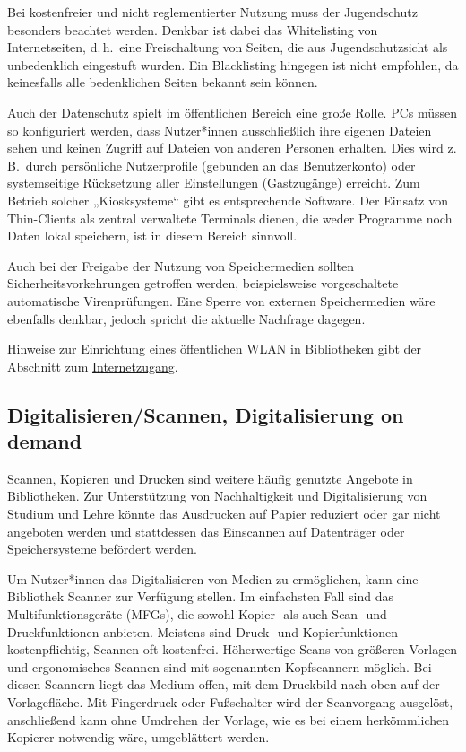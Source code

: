 \documentclass[
  11pt,
  letterpaper,
  DIV=11,
  twoside]{scrreprt}
\begin{document}
Bei kostenfreier und nicht reglementierter Nutzung muss der Jugendschutz
besonders beachtet werden. Denkbar ist dabei das Whitelisting von
Internetseiten, d.\,h.~eine Freischaltung von Seiten, die aus
Jugendschutzsicht als unbedenklich eingestuft wurden. Ein Blacklisting
hingegen ist nicht empfohlen, da keinesfalls alle bedenklichen Seiten
bekannt sein können.

Auch der Datenschutz spielt im öffentlichen Bereich eine große Rolle.
PCs müssen so konfiguriert werden, dass Nutzer*innen ausschließlich ihre
eigenen Dateien sehen und keinen Zugriff auf Dateien von anderen
Personen erhalten. Dies wird z.\,B.~durch persönliche Nutzerprofile
(gebunden an das Benutzerkonto) oder systemseitige Rücksetzung aller
Einstellungen (Gastzugänge) erreicht. Zum Betrieb solcher
„Kiosksysteme`` gibt es entsprechende Software. Der Einsatz von
Thin-Clients als zentral verwaltete Terminals dienen, die weder
Programme noch Daten lokal speichern, ist in diesem Bereich sinnvoll.

Auch bei der Freigabe der Nutzung von Speichermedien sollten
Sicherheitsvorkehrungen getroffen werden, beispielsweise vorgeschaltete
automatische Virenprüfungen. Eine Sperre von externen Speichermedien
wäre ebenfalls denkbar, jedoch spricht die aktuelle Nachfrage dagegen.

Hinweise zur Einrichtung eines öffentlichen WLAN in Bibliotheken gibt
der Abschnitt zum \hyperref[internetzugang]{Internetzugang}.

\subsection{Digitalisieren/Scannen, Digitalisierung on
demand}\label{digitalisierenscannen-digitalisierung-on-demand}

Scannen, Kopieren und Drucken sind weitere häufig genutzte Angebote in
Bibliotheken. Zur Unterstützung von Nachhaltigkeit und Digitalisierung
von Studium und Lehre könnte das Ausdrucken auf Papier reduziert oder
gar nicht angeboten werden und stattdessen das Einscannen auf
Datenträger oder Speichersysteme befördert werden.

Um Nutzer*innen das Digitalisieren von Medien zu ermöglichen, kann eine
Bibliothek Scanner zur Verfügung stellen. Im einfachsten Fall sind das
Multifunktionsgeräte (MFGs), die sowohl Kopier- als auch Scan- und
Druckfunktionen anbieten. Meistens sind Druck- und Kopierfunktionen
kostenpflichtig, Scannen oft kostenfrei. Höherwertige Scans von größeren
Vorlagen und ergonomisches Scannen sind mit sogenannten Kopfscannern
möglich. Bei diesen Scannern liegt das Medium offen, mit dem Druckbild
nach oben auf der Vorlagefläche. Mit Fingerdruck oder Fußschalter wird
der Scanvorgang ausgelöst, anschließend kann ohne Umdrehen der Vorlage,
wie es bei einem herkömmlichen Kopierer notwendig wäre, umgeblättert
werden.
\end{document}
